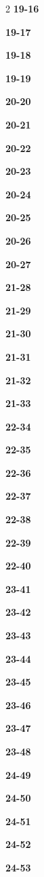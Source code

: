 \documentclass[10pt,a4paper]{article}
\begin{document}
\begin{multicols}{2}
\noindent\textbf{19-16}\ \par
\noindent\textbf{19-17}\ \par
\noindent\textbf{19-18}\ \par
\noindent\textbf{19-19}\ \par
\noindent\textbf{20-20}\ \par
\noindent\textbf{20-21}\ \par
\noindent\textbf{20-22}\ \par
\noindent\textbf{20-23}\ \par
\noindent\textbf{20-24}\ \par
\noindent\textbf{20-25}\ \par
\noindent\textbf{20-26}\ \par
\noindent\textbf{20-27}\ \par
\noindent\textbf{21-28}\ \par
\noindent\textbf{21-29}\ \par
\noindent\textbf{21-30}\ \par
\noindent\textbf{21-31}\ \par
\noindent\textbf{21-32}\ \par
\noindent\textbf{21-33}\ \par
\noindent\textbf{22-34}\ \par
\noindent\textbf{22-35}\ \par
\noindent\textbf{22-36}\ \par
\noindent\textbf{22-37}\ \par
\noindent\textbf{22-38}\ \par
\noindent\textbf{22-39}\ \par
\noindent\textbf{22-40}\ \par
\noindent\textbf{23-41}\ \par
\noindent\textbf{23-42}\ \par
\noindent\textbf{23-43}\ \par
\noindent\textbf{23-44}\ \par
\noindent\textbf{23-45}\ \par
\noindent\textbf{23-46}\ \par
\noindent\textbf{23-47}\ \par
\noindent\textbf{23-48}\ \par
\noindent\textbf{24-49}\ \par
\noindent\textbf{24-50}\ \par
\noindent\textbf{24-51}\ \par
\noindent\textbf{24-52}\ \par
\noindent\textbf{24-53}\ \par

\end{multicols}
\end{document}
